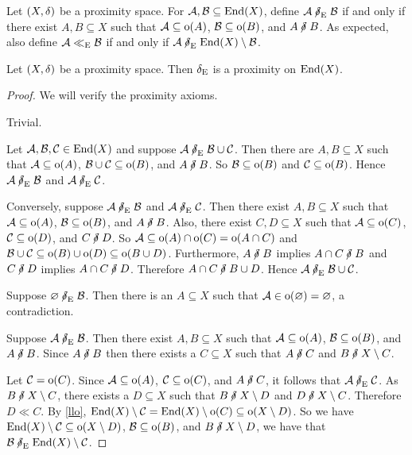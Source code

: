 \begin{definition}
	Let \( (X,\mathord{\delta}) \) be a proximity space.  For \( \mathcal{A},\mathcal{B} \subseteq \operatorname{End}(X) \), define \( \cA \nneare \cB \) if and only if there exist \( A,B \subseteq X \) such that \( \mathcal{A} \subseteq \operatorname{o}(A) \), \( \mathcal{B} \subseteq \operatorname{o}(B) \), and \( A \nnear B \).  As expected, also define \( \mathcal{A} \mathrel{\ll_\text{E}} \mathcal{B} \) if and only if \( \cA \nneare \End(X) \setminus \cB \).
\end{definition}

\begin{proposition}
	Let \( (X,\mathord{\delta}) \) be a proximity space.  Then \( \mathrel{\delta_\text{E}} \) is a proximity on \( \operatorname{End}(X) \).
\end{proposition}
\begin{proof}
	We will verify the proximity axioms.
	
	 Trivial.
	
	 Let \( \mathcal{A},\mathcal{B},\mathcal{C} \in \operatorname{End}(X) \) and suppose \( \cA \nneare \cB \cup \cC \).  Then there are \( A,B \subseteq X \) such that \( \mathcal{A} \subseteq \operatorname{o}(A) \), \( \mathcal{B} \cup \mathcal{C} \subseteq \operatorname{o}(B) \), and \( A \nnear B \).  So \( \mathcal{B} \subseteq \operatorname{o}(B) \) and \( \mathcal{C} \subseteq \operatorname{o}(B) \).  Hence \( \cA \nneare \cB \) and \( \cA \nneare \cC \).
	
		Conversely, suppose \( \cA \nneare \cB \) and \( \cA \nneare \cC \).  Then there exist \( A,B \subseteq X \) such that \( \mathcal{A} \subseteq \operatorname{o}(A) \), \( \mathcal{B} \subseteq \operatorname{o}(B) \), and \( A \nnear B \).  Also, there exist \( C,D \subseteq X \) such that \( \mathcal{A} \subseteq \operatorname{o}(C) \), \( \mathcal{C} \subseteq \operatorname{o}(D) \), and \( C \nnear D \).  So \( \mathcal{A} \subseteq \operatorname{o}(A) \cap \operatorname{o}(C) = \operatorname{o}(A \cap C) \) and \( \mathcal{B} \cup \mathcal{C} \subseteq \operatorname{o}(B) \cup \operatorname{o}(D) \subseteq \operatorname{o}(B \cup D) \).  Furthermore, \( A \nnear B \) implies \( A \cap C \nnear B \) and \( C \nnear D \) implies \( A \cap C \nnear D \).  Therefore \( A \cap C \nnear B \cup D \).  Hence \( \cA \nneare \cB \cup \cC \).
	
	 Suppose \( \emptyset \nneare \cB \).  Then there is an \( A \subseteq X \) such that \( \mathcal{A} \in \operatorname{o}(\varnothing) = \varnothing \), a contradiction.
	
	 Suppose \( \cA \nneare \cB \).  Then there exist \( A,B \subseteq X \) such that \( \mathcal{A} \subseteq \operatorname{o}(A) \), \( \mathcal{B} \subseteq \operatorname{o}(B) \), and \( A \nnear B \).  Since \( A \nnear B \) then there exists a \( C \subseteq X \) such that \( A \nnear C \) and \( B \nnear X \setminus C \).
	
		Let \( \mathcal{C} = \operatorname{o}(C) \).  Since \( \mathcal{A} \subseteq \operatorname{o}(A) \), \( \mathcal{C} \subseteq \operatorname{o}(C) \), and \( A \nnear C \), it follows that \( \cA \nneare \cC \).  As \( B \nnear X \setminus C \), there exists a \( D \subseteq X \) such that \( B \nnear X \setminus D \) and \( D \nnear X \setminus C \).  Therefore \( D \ll C \).  By \ref{llo}, \( \operatorname{End}(X) \setminus \mathcal{C} = \operatorname{End}(X) \setminus \operatorname{o}(C) \subseteq \operatorname{o}(X \setminus D) \).  So we have \( \operatorname{End}(X) \setminus \mathcal{C} \subseteq \operatorname{o}(X \setminus D) \), \( \mathcal{B} \subseteq \operatorname{o}(B) \), and \( B \nnear X \setminus D \), we have that \( \cB \nneare \End(X) \setminus \cC \).
		

\end{proof}
